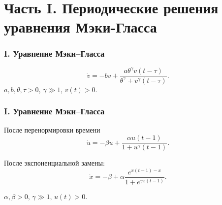 \section{Часть I. Периодические решения уравнения Мэки-Гласса}

\begin{frame}
	\frametitle{I. Уравнение Мэки--Гласса}
	\begin{equation*}
		\label{eq:MG}
		\dot{v}=-b v+\frac{a \theta^{\gamma} v(t-\tau)}{\theta^{\gamma}+v^{\gamma}(t-\tau)}.
	\end{equation*}
	$a, b, \theta, \tau > 0$, $\gamma \gg 1$, $v(t) > 0$.
\end{frame}

\vspace{2em}

\begin{frame}
	\frametitle{I. Уравнение Мэки--Гласса}
	После перенормировки времени
	\begin{equation*}
		\label{eq:MG_norm}
		\dot{u}=-\beta u + \frac{\alpha u(t - 1)}{1 + u^{\gamma}(t - 1)}.
	\end{equation*}
	
	После экспоненциальной замены:
	\begin{equation}
		\label{eq:MG_x}
		\dot{x}=-\beta+\alpha\frac{e^{x(t-1)-x}}{1 + e^{\gamma x(t-1)}}.
	\end{equation}
	
	$\alpha, \beta > 0$, $\gamma \gg 1$, $u(t) > 0$.
\end{frame}

